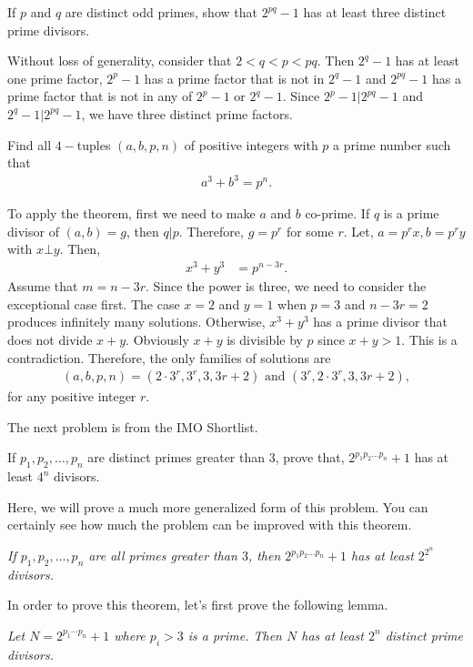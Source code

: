 \documentclass{subfile}
\begin{document}
		\begin{problem}
			If $p$ and $q$ are distinct odd primes, show that $2^{pq}-1$ has at least three distinct prime divisors.
		\end{problem}

		\begin{solution}
			Without loss of generality, consider that $2<q<p<pq$. Then $2^q-1$ has at least one prime factor, $2^p-1$ has a prime factor that is not in $2^q-1$ and $2^{pq}-1$ has a prime factor that is not in any of $2^p-1$ or $2^q-1$. Since $2^p-1|2^{pq}-1$ and $2^{q}-1|2^{pq}-1$, we have three distinct prime factors.
		\end{solution}


		\begin{problem}
			Find all $4-$tuples $(a,b,p,n)$ of positive integers with $p$ a prime number such that
				\begin{align*}
					a^3+b^3=p^n.
				\end{align*}
		\end{problem}

		\begin{solution}
			To apply the theorem, first we need to make $a$ and $b$ co-prime. If $q$ is a prime divisor of $(a,b)=g$, then $q|p$. Therefore, $g=p^r$ for some $r$. Let, $a=p^rx,b=p^ry$ with $x\bot y$. Then,
				\begin{align*}
					x^3+y^3 & = p^{n-3r}.
				\end{align*}
			Assume that $m=n-3r$. Since the power is three, we need to consider the exceptional case first. The case $x=2$ and $y=1$ when $p=3$ and $n-3r=2$ produces infinitely many solutions. Otherwise, $x^3+y^3$ has a prime divisor that does not divide $x+y$. Obviously $x+y$ is divisible by $p$ since $x+y>1$. This is a contradiction. Therefore, the only families of solutions are
				\begin{align*}
					(a,b,p,n)=(2\cdot 3^r,3^r,3,3r+2) \text{ and }(3^r,2\cdot 3^r,3,3r+2),
				\end{align*}
			for any positive integer $r$.
		\end{solution}

	The next problem is from the IMO Shortlist.
		\begin{problem}
			If $p_1,p_2,\dots,p_n$ are distinct primes greater than $3$, prove that, $2^{p_1p_2\dots p_n}+1$ has at least $4^n$ divisors.
		\end{problem}
	Here, we will prove a much more generalized form of this problem.  You can certainly see how much the problem can be improved with this theorem.
		\begin{theorem}\slshape
			If $p_1,p_2,\dots,p_n$ are all primes greater than $3$, then $2^{p_1p_2\dots p_n}+1$ has at least $2^{2^n}$ divisors.
		\end{theorem}
	In order to prove this theorem, let's first prove the following lemma.
		\begin{lemma}\slshape
			Let $N=2^{p_1\cdots p_n}+1$ where $p_i>3$ is a prime. Then $N$ has at least $2^n$ distinct prime divisors.
		\end{lemma}
\end{document}
